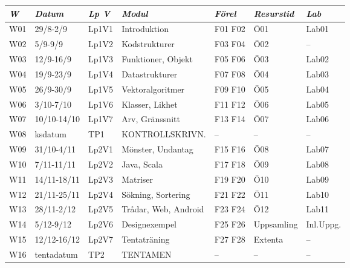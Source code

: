 \begin{tabular}{l|l|l|l|l|l|l}
\textit{W} & \textit{Datum} & \textit{Lp V} & \textit{Modul} & \textit{Förel} & \textit{Resurstid} & \textit{Lab} \\ \hline \hline
W01 & 29/8-2/9    & Lp1V1 & Introduktion         & F01 F02 & Ö01        & Lab01     \\
W02 & 5/9-9/9     & Lp1V2 & Kodstrukturer        & F03 F04 & Ö02        & --        \\
W03 & 12/9-16/9   & Lp1V3 & Funktioner, Objekt   & F05 F06 & Ö03        & Lab02     \\
W04 & 19/9-23/9   & Lp1V4 & Datastrukturer       & F07 F08 & Ö04        & Lab03     \\
W05 & 26/9-30/9   & Lp1V5 & Vektoralgoritmer     & F09 F10 & Ö05        & Lab04     \\
W06 & 3/10-7/10   & Lp1V6 & Klasser, Likhet      & F11 F12 & Ö06        & Lab05     \\
W07 & 10/10-14/10 & Lp1V7 & Arv, Gränssnitt      & F13 F14 & Ö07        & Lab06     \\
W08 & ksdatum     & TP1   & KONTROLLSKRIVN.      & --      & --         & --        \\
W09 & 31/10-4/11  & Lp2V1 & Mönster, Undantag    & F15 F16 & Ö08        & Lab07     \\
W10 & 7/11-11/11  & Lp2V2 & Java, Scala          & F17 F18 & Ö09        & Lab08     \\
W11 & 14/11-18/11 & Lp2V3 & Matriser             & F19 F20 & Ö10        & Lab09     \\
W12 & 21/11-25/11 & Lp2V4 & Sökning, Sortering   & F21 F22 & Ö11        & Lab10     \\
W13 & 28/11-2/12  & Lp2V5 & Trådar, Web, Android & F23 F24 & Ö12        & Lab11     \\
W14 & 5/12-9/12   & Lp2V6 & Designexempel        & F25 F26 & Uppsamling & Inl.Uppg. \\
W15 & 12/12-16/12 & Lp2V7 & Tentaträning         & F27 F28 & Extenta    & --        \\
W16 & tentadatum  & TP2   & TENTAMEN             & --      & --         & --        \\
\end{tabular}

